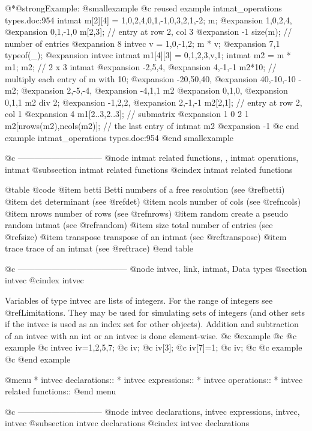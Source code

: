 {{{{@*@strong{Example:}
@smallexample
@c reused example intmat_operations types.doc:954 
  intmat m[2][4] = 1,0,2,4,0,1,-1,0,3,2,1,-2;
  m;
@expansion{} 1,0,2,4,
@expansion{} 0,1,-1,0 
  m[2,3];          // entry at row 2, col 3
@expansion{} -1
  size(m);         // number of entries
@expansion{} 8
  intvec v = 1,0,-1,2;
  m * v;
@expansion{} 7,1
  typeof(_);
@expansion{} intvec
  intmat m1[4][3] = 0,1,2,3,v,1;
  intmat m2 = m * m1;
  m2;             //  2 x 3 intmat
@expansion{} -2,5,4,
@expansion{} 4,-1,-1 
  m2*10;           // multiply each entry of m with 10;
@expansion{} -20,50,40,
@expansion{} 40,-10,-10 
  -m2;
@expansion{} 2,-5,-4,
@expansion{} -4,1,1 
  m2 %
@expansion{} 0,1,0,
@expansion{} 0,1,1 
  m2 div 2;
@expansion{} -1,2,2,
@expansion{} 2,-1,-1 
  m2[2,1];          // entry at row 2, col 1
@expansion{} 4
  m1[2..3,2..3];   // submatrix
@expansion{} 1 0 2 1
  m2[nrows(m2),ncols(m2)];      // the last entry of intmat m2
@expansion{} -1
@c end example intmat_operations types.doc:954
@end smallexample

@c ------------------------------
@node intmat related functions,  , intmat operations, intmat
@subsection intmat related functions
@cindex intmat related functions

@table @code
@item betti
Betti numbers of a free resolution (see @ref{betti})
@item det
determinant (see @ref{det})
@item ncols
number of cols (see @ref{ncols})
@item nrows
number of rows (see @ref{nrows})
@item random
create a pseudo random intmat (see @ref{random})
@item size
total number of entries (see @ref{size})
@item transpose
transpose of an intmat (see @ref{transpose})
@item trace
trace of an intmat (see @ref{trace})
@end table

@c ---------------------------------------
@node intvec, link, intmat, Data types
@section intvec
@cindex intvec

Variables of type intvec are lists of integers.  For the range of
integers see @ref{Limitations}. They may be used for simulating
sets of integers (and other sets if the intvec is used as an index set
for other objects). Addition and subtraction of an
intvec with an int or an intvec is done element-wise.
@c @example
@c @c example
@c   intvec iv=1,2,5,7;
@c   iv;
@c   iv[3];
@c   iv[7]=1;
@c   iv;
@c @c example
@c @end example

@menu
* intvec declarations::
* intvec expressions::
* intvec operations::
* intvec related functions::
@end menu

@c ------------------------------
@node intvec declarations, intvec expressions, intvec, intvec
@subsection intvec declarations
@cindex intvec declarations

}}}}
